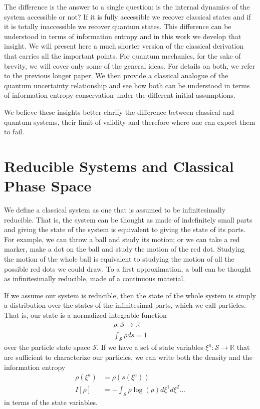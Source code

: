 \documentclass{article}
\begin{document}
The difference is the answer to a single question: is the internal dynamics of the system accessible or not? If it is fully accessible we recover classical states and if it is totally inaccessible we recover quantum states. This difference can be understood in terms of information entropy and in this work we develop that insight. We will present here a much shorter version of the classical derivation that carries all the important points. For quantum mechanics, for the sake of brevity, we will cover only some of the general ideas. For details on both, we refer to the previous longer paper\cite{Carc1}. We then provide a classical analogue of the quantum uncertainty relationship and see how both can be understood in terms of information entropy conservation under the different initial assumptions.

We believe these insights better clarify the difference between classical and quantum systems, their limit of validity and therefore where one can expect them to fail.

\section{Reducible Systems and Classical Phase Space}
We define a classical system as one that is assumed to be infinitesimally reducible. That is, the system can be thought as made of indefinitely small parts and giving the state of the system is equivalent to giving the state of its parts. For example, we can throw a ball and study its motion; or we can take a red marker, make a dot on the ball and study the motion of the red dot. Studying the motion of the whole ball is equivalent to studying the motion of all the possible red dots we could draw. To a first approximation, a ball can be thought as infinitesimally reducible, made of a continuous material.

If we assume our system is reducible, then the state of the whole system is simply a distribution over the states of the infinitesimal parts, which we call particles. That is, our state is a normalized integrable function
\begin{equation}
\begin{aligned}
	\rho : \mathcal{S} \to \mathbb{R} \\
	\int_{\mathcal{S}} \rho ds = 1
\end{aligned}
\end{equation}
over the particle state space $\mathcal{S}$. If we have a set of state variables $\xi^a : \mathcal{S} \to \mathbb{R}$ that are sufficient to characterize our particles, we can write both the density and the information entropy
\begin{equation}
\begin{aligned}
\rho(\xi^a) &= \rho(s(\xi^a)) \\
I[\rho] &= - \int_{\mathcal{S}} \rho \log (\rho) d\xi^1 d\xi^2 ...
\end{aligned}
\end{equation}
in terms of the state variables.
\end{document}
